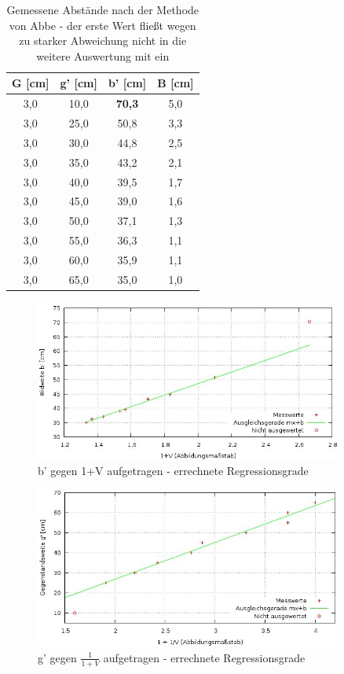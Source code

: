 \begin{table}[htbp]
\begin{center}
\begin{tabular}{|c|c|c|c|}
G [cm] & g' [cm] & b' [cm] & B [cm]\\
\hline
3,0 & 10,0 & \textbf{70,3} & 5,0 \\ \hline
3,0 & 25,0 & 50,8 & 3,3 \\ \hline
3,0 & 30,0 & 44,8 & 2,5 \\ \hline
3,0 & 35,0 & 43,2 & 2,1 \\ \hline
3,0 & 40,0 & 39,5 & 1,7 \\ \hline
3,0 & 45,0 & 39,0 & 1,6 \\ \hline
3,0 & 50,0 & 37,1 & 1,3 \\ \hline
3,0 & 55,0 & 36,3 & 1,1 \\ \hline
3,0 & 60,0 & 35,9 & 1,1 \\ \hline
3,0 & 65,0 & 35,0 & 1,0 \\ \hline
\end{tabular}
\end{center}
\caption{Gemessene Abstände nach der Methode von Abbe - der erste Wert fließt wegen zu starker Abweichung nicht in die weitere Auswertung mit ein}
\label{tababbe}
\end{table}

\begin{figure}[H]
\includegraphics[width=0.9\textwidth]{pics/abbe1.jpg}
\caption{b' gegen 1+V aufgetragen - errechnete Regressionsgrade}
\end{figure}

\hspace{2cm}

\begin{figure}[H]
\includegraphics[width=0.9\textwidth]{pics/abbe2.jpg}
\caption{g' gegen $\frac{1}{1+V}$ aufgetragen - errechnete Regressionsgrade}
\end{figure}


